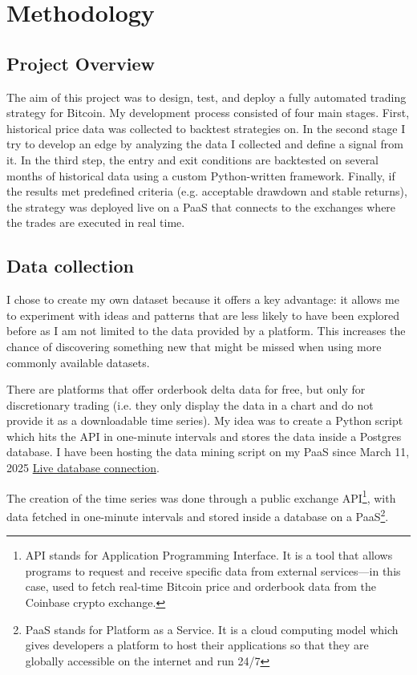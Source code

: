 \documentclass[12pt]{article}
\begin{document}
\newpage
\section{Methodology}

\subsection{Project Overview}
The aim of this project was to design, test, and deploy a fully automated trading strategy for Bitcoin.
My development process consisted of four main stages. First, historical price data was collected to backtest strategies on.
In the second stage I try to develop an edge by analyzing the data I collected and define a signal from it.
In the third step, the entry and exit conditions are backtested on several months of historical data using a custom Python-written framework. Finally, if the results met predefined criteria (e.g. acceptable drawdown and stable returns), the strategy was deployed live on a PaaS that connects to the exchanges where the trades are executed in real time.

\subsection{Data collection}



I chose to create my own dataset because it offers a key advantage: it allows me to experiment with ideas and patterns that are less likely to have been explored before as I am not limited to the data provided by a platform. 
This increases the chance of discovering something new that might be missed when using more commonly available datasets.

There are platforms that offer orderbook delta data for free, but only for discretionary trading (i.e. they only display the data in a chart and do not provide it as a downloadable time series). My idea was to create a Python script which hits the API in one-minute intervals and stores the data inside a Postgres database. I have been hosting the data mining script on my PaaS since March 11, 2025 \href{https://customchart-production.up.railway.app/#}{Live database connection}.

The creation of the time series was done through a public exchange API\footnote[1]{API stands for Application Programming Interface. It is a tool that allows programs to request and receive specific data from external services—in this case, used to fetch real-time Bitcoin price and orderbook data from the Coinbase crypto exchange.}, with data fetched in one-minute intervals and stored inside a database on a PaaS\footnote[2]{PaaS stands for Platform as a Service. It is a cloud computing model which gives developers a platform to host their applications so that they are globally accessible on the internet and run 24/7}.
\end{document}
